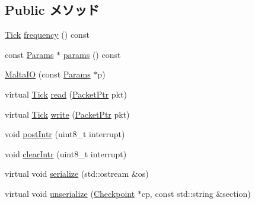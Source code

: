 \subsection*{Public メソッド}
\begin{DoxyCompactItemize}
\item 
\hyperlink{base_2types_8hh_a5c8ed81b7d238c9083e1037ba6d61643}{Tick} \hyperlink{classMaltaIO_ae7d31c6aab76d9d4e74e5e7227337651}{frequency} () const 
\item 
const \hyperlink{classMaltaIO_a67250d5117f4f6705cea74a7a228ccf0}{Params} $\ast$ \hyperlink{classMaltaIO_acd3c3feb78ae7a8f88fe0f110a718dff}{params} () const 
\item 
\hyperlink{classMaltaIO_a4a44a2fd97be4aa558dcc9c5751df3bc}{MaltaIO} (const \hyperlink{classMaltaIO_a67250d5117f4f6705cea74a7a228ccf0}{Params} $\ast$p)
\item 
virtual \hyperlink{base_2types_8hh_a5c8ed81b7d238c9083e1037ba6d61643}{Tick} \hyperlink{classMaltaIO_a613ec7d5e1ec64f8d21fec78ae8e568e}{read} (\hyperlink{classPacket}{PacketPtr} pkt)
\item 
virtual \hyperlink{base_2types_8hh_a5c8ed81b7d238c9083e1037ba6d61643}{Tick} \hyperlink{classMaltaIO_a4cefab464e72b5dd42c003a0a4341802}{write} (\hyperlink{classPacket}{PacketPtr} pkt)
\item 
void \hyperlink{classMaltaIO_a317c725ef6a1fef61239e5682988cc87}{postIntr} (uint8\_\-t interrupt)
\item 
void \hyperlink{classMaltaIO_ae777549b457b25efd35a47f13974f2e1}{clearIntr} (uint8\_\-t interrupt)
\item 
virtual void \hyperlink{classMaltaIO_ad6272f80ae37e8331e3969b3f072a801}{serialize} (std::ostream \&os)
\item 
virtual void \hyperlink{classMaltaIO_af100c4e9feabf3cd918619c88c718387}{unserialize} (\hyperlink{classCheckpoint}{Checkpoint} $\ast$cp, const std::string \&section)
\end{DoxyCompactItemize}
